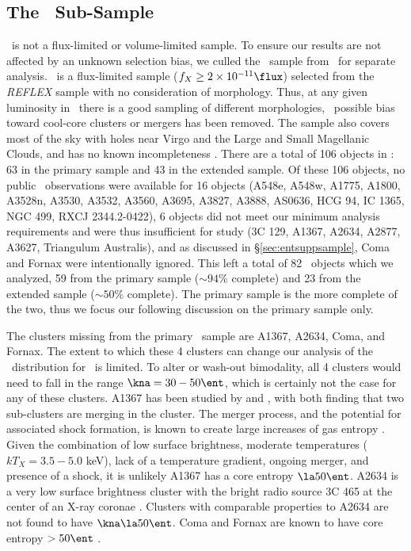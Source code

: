\subsection{The \hifl\ Sub-Sample}
\label{sec:entsupphifl}

\accept\ is not a flux-limited or volume-limited sample. To ensure our
results are not affected by an unknown selection bias, we culled the
\hifl\ sample from \accept\ for separate analysis. \hifl\ is a
flux-limited sample ($f_X \ge 2 \times 10^{-11} \flux$) selected from
the {\it{REFLEX}} sample \citep{reflex} with no consideration of
morphology. Thus, at any given luminosity in \hifl\ there is a good
sampling of different morphologies, \ie\ possible bias toward
cool-core clusters or mergers has been removed. The sample also covers
most of the sky with holes near Virgo and the Large and Small
Magellanic Clouds, and has no known incompleteness
\citep{2007A&A...466..805C}. There are a total of 106 objects in
\hifl: 63 in the primary sample and 43 in the extended sample. Of
these 106 objects, no public \chandra\ observations were available for
16 objects (A548e, A548w, A1775, A1800, A3528n, A3530, A3532, A3560,
A3695, A3827, A3888, AS0636, HCG 94, IC 1365, NGC 499, RXCJ
2344.2-0422), 6 objects did not meet our minimum analysis requirements
and were thus insufficient for study (3C 129, A1367, A2634, A2877,
A3627, Triangulum Australis), and as discussed in \S\ref{sec:entsuppsample},
Coma and Fornax were intentionally ignored. This left a total of 82
\hifl\ objects which we analyzed, 59 from the primary sample ($\sim
94\%$ complete) and 23 from the extended sample ($\sim 50\%$
complete). The primary sample is the more complete of the two, thus we
focus our following discussion on the primary sample only.

The clusters missing from the primary \hifl\ sample are A1367, A2634,
Coma, and Fornax. The extent to which these 4 clusters can change our
analysis of the \kna\ distribution for \hifl\ is limited.  To alter or
wash-out bimodality, all 4 clusters would need to fall in the range
$\kna = 30-50 \ent$, which is certainly not the case for any of these
clusters. A1367 has been studied by \citet{1998ApJ...500..138D} and
\citet{2002ApJ...576..708S}, with both finding that two sub-clusters
are merging in the cluster. The merger process, and the potential for
associated shock formation, is known to create large increases of gas
entropy \citep{2007MNRAS.376..497M}. Given the combination of low
surface brightness, moderate temperatures ($kT_X = 3.5-5.0$ keV), lack
of a temperature gradient, ongoing merger, and presence of a shock, it
is unlikely A1367 has a core entropy $\la 50 \ent$. A2634 is a very
low surface brightness cluster with the bright radio source 3C 465 at
the center of an X-ray coronae \citep{coronae}. Clusters with
comparable properties to A2634 are not found to have $\kna \la 50
\ent$. Coma and Fornax are known to have core entropy $> 50 \ent$
\citep{2008ApJ...687..899R}.

